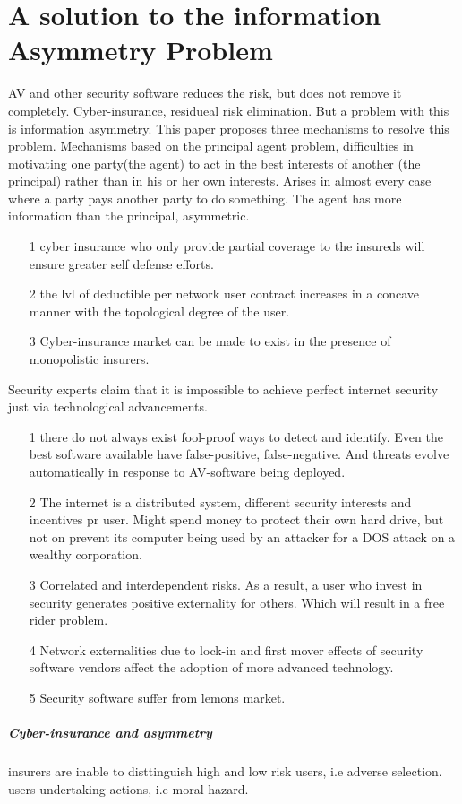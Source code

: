 \section{A solution to the information Asymmetry Problem}
AV and other security software reduces the risk, but does not remove it completely. Cyber-insurance,
 residueal risk elimination. But a problem with this is information asymmetry. This paper proposes
  three mechanisms to resolve this problem. Mechanisms based on the principal agent problem,
   difficulties in motivating one party(the agent) to act in the best interests of another 
   (the principal) rather than in his or her own interests. Arises in almost every case where a party
    pays another party to do something. The agent has more information than the principal, asymmetric.
\begin{itemize}
 \item[1] cyber insurance who only provide partial coverage to the insureds will ensure greater self defense efforts.
 \item[2] the lvl of deductible per network user contract increases in a concave manner with the topological degree of the user.
 \item[3] Cyber-insurance market can be made to exist in the presence of monopolistic insurers.
 
\end{itemize} 
Security experts claim that it is impossible to achieve perfect internet security just via technological advancements.
\begin{itemize}
\item[1] there do not always exist fool-proof ways to detect and identify. 
Even the best software available have false-positive, false-negative. And threats evolve automatically in response to AV-software being deployed. 
\item[2] The internet is a distributed system, different security interests and incentives pr user.
 Might spend money to protect their own hard drive, but not on prevent its computer being used by an
  attacker for a DOS attack on a wealthy corporation. 
\item[3] Correlated and interdependent risks. As a result, a user who invest in security generates
 positive externality for others. Which will result in a free rider problem.
\item[4] Network externalities due to lock-in and first mover effects of security software vendors
 affect the adoption of more advanced technology.
\item[5] Security software suffer from lemons market. 
\end{itemize}
 \subparagraph{Cyber-insurance and asymmetry}
 insurers are inable to disttinguish high and low risk users, i.e adverse selection.
 users undertaking actions, i.e moral hazard. 
 
